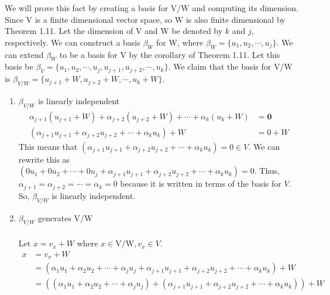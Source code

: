 \documentclass[11pt]{scrartcl}
\begin{document}
\begin{enumerate}[label=\alph*.]
		      We will prove this fact by creating a basis for $\mathrm{V}/\mathrm{W}$ and computing its dimension.
		      Since $\mathrm{V}$ is a finite dimensional vector space, so $\mathrm{W}$ is also finite dimensional by Theorem 1.11.
		      Let the dimension of $\mathrm{V}$ and $\mathrm{W}$ be denoted by $k$ and $j$, respectively.
		      We can construct a basis $\beta_W$ for $\mathrm{W}$, where $\beta_W = \{u_1, u_2, \cdots, u_j\}$.
		      We can extend $\beta_W$ to be a basis for $\mathrm{V}$ by the corollary of Theorem 1.11.
		      Let this basis be $\beta_V = \{u_1, u_2, \cdots, u_j, u_{j+1}, u_{j+2}, \cdots , u_{k}\}$.
		      We claim that the basis for $\mathrm{V}/\mathrm{W}$ is
		      $\beta_{V/W} = \{u_{j+1} + W, u_{j+2} + W, \cdots , u_{k} + W\}$.
		      \begin{enumerate}[label=\roman*.]
			      \item{
			            $\beta_{V/W}$ is linearly independent
			            \begin{align*}
				            \alpha_{j+1}(u_{j+1} + W) + \alpha_{j+2}(u_{j+2} + W) + \cdots + \alpha_{k}(u_{k} + W) & = \mathbf{0} \\
				            (\alpha_{j+1}u_{j+1} + \alpha_{j+2}u_{j+2} + \cdots + \alpha_{k}u_{k}) + W             & = 0 + W
			            \end{align*}
			            This means that $(\alpha_{j+1}u_{j+1} + \alpha_{j+2}u_{j+2} + \cdots + \alpha_{k}u_{k}) = 0 \in V$.
			            We can rewrite this as $(0u_1 + 0u_2 + \cdots + 0u_j + \alpha_{j+1}u_{j+1} + \alpha_{j+2}u_{j+2} + \cdots + \alpha_{k}u_{k}) = 0$.
			            Thus, $ \alpha_{j+1} = \alpha_{j+2} = \cdots = \alpha_{k} = 0$ because it is written in terms
			            of the basis for $V$. So, $\beta_{V/W}$ is linearly independent.
			            }
			      \item{
			            $\beta_{V/W}$ generates $\mathrm{V}/\mathrm{W}$\\\-\\
			            Let $x = v_x + W$ where $x \in \mathrm{V}/\mathrm{W}, v_x \in V$.
			            \begin{align*}
				            x & = v_x + W                                                                                                                            \\
				              & = (\alpha_1u_1 + \alpha_2u_2 + \cdots + \alpha_ju_j + \alpha_{j+1}u_{j+1} + \alpha_{j+2}u_{j+2} + \cdots + \alpha_{k}u_{k}) + W      \\
				              & =  ((\alpha_1u_1 + \alpha_2u_2 + \cdots + \alpha_ju_j) + (\alpha_{j+1}u_{j+1} + \alpha_{j+2}u_{j+2} + \cdots + \alpha_{k}u_{k})) + W \\

\end{align*}}
\end{enumerate}
\end{enumerate}
\end{document}
